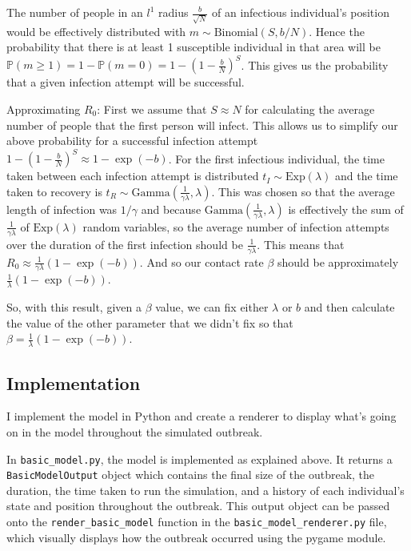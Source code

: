 \documentclass[11pt]{article}
\begin{document}
The number of people in an $l^1$ radius $\frac{b}{\sqrt{N}}$ of an infectious individual's position would be effectively distributed with $m\sim \text{Binomial}(S,b/N)$. Hence the probability that there is at least 1 susceptible individual in that area will be $\mathbb{P}(m\geq 1) = 1-\mathbb{P}(m=0) = 1-(1-\frac{b}{N})^S$. This gives us the probability that a given infection attempt will be successful.

Approximating $R_0$: First we assume that $S\approx N$ for calculating the average number of people that the first person will infect. This allows us to simplify our above probability for a successful infection attempt $1-(1-\frac{b}{N})^S\approx 1-\exp(-b)$. For the first infectious individual, the time taken between each infection attempt is distributed $t_I\sim \text{Exp}(\lambda)$ and the time taken to recovery is $t_R \sim \text{Gamma}(\frac{1}{\gamma\lambda}, \lambda)$. This was chosen so that the average length of infection was $1/\gamma$ and because $\text{Gamma}(\frac{1}{\gamma\lambda}, \lambda)$ is effectively the sum of $\frac{1}{\gamma\lambda}$ of $\text{Exp}(\lambda)$ random variables, so the average number of infection attempts over the duration of the first infection should be $\frac{1}{\gamma\lambda}$. This means that $R_0\approx\frac{1}{\gamma\lambda}(1-\exp(-b))$. And so our contact rate $\beta$ should be approximately $\frac{1}{\lambda}(1-\exp(-b))$.

So, with this result, given a $\beta$ value, we can fix either $\lambda$ or $b$ and then calculate the value of the other parameter that we didn't fix so that $\beta = \frac{1}{\lambda}(1-\exp(-b))$.

\subsection{Implementation}
I implement the model in Python and create a renderer to display what's going on in the model throughout the simulated outbreak.

In \texttt{basic\_model.py}, the model is implemented as explained above.
It returns a \texttt{BasicModelOutput} object which contains the final size of the outbreak, the duration, the time taken to run the simulation, and a history of each individual's state and position throughout the outbreak.
This output object can be passed onto the \texttt{render\_basic\_model} function in the \texttt{basic\_model\_renderer.py} file, which visually displays how the outbreak occurred using the pygame module.
\end{document}
